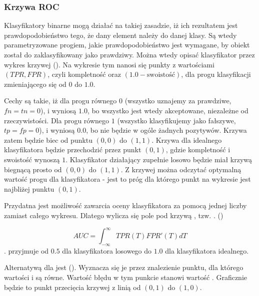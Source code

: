 \subsubsection{Krzywa ROC}

Klasyfikatory binarne mogą działać na takiej zasadzie, iż ich rezultatem jest prawdopodobieństwo
tego, że dany element należy do danej klasy. Są wtedy parametryzowane progiem,
jakie prawdopodobieństwo jest wymagane, by obiekt został do zaklasyfikowany jako prawdziwy.
Można wtedy opisać klasyfikator przez wykres krzywej 
(). Na wykresie tym nanosi się punkty z wartościami
$(\mathit{TPR}, \mathit{FPR})$, czyli kompletność oraz $(1.0 - \text{swoistość})$, dla progu klasyfikacji
zmieniającego się od $0$ do $1.0$.

Cechy  są takie, iż dla progu równego $0$ (wszystko uznajemy za prawdziwe, $fn = tn = 0$),
 i 
wyniosą $1.0$, bo wszystko jest wtedy akceptowane, niezależne od rzeczywistości.
Dla progu równego $1$ (wszystko klasyfikujemy jako fałszywe, $tp = fp = 0$),
 i  wyniosą $0.0$, bo nie będzie w ogóle żadnych pozytywów.
Krzywa zatem będzie biec od punktu $(0, 0)$ do $(1, 1)$. Krzywa dla idealnego klasyfikatora
będzie przechodzić przez punkt $(0, 1)$, gdzie kompletność i swoistość wynoszą $1$. Klasyfikator
działający zupełnie losowo będzie miał krzywą biegnącą prosto od $(0, 0)$ do $(1, 1)$. Z krzywej
 można odczytać optymalną wartość progu dla klasyfikatora - jest to próg dla którego punkt
na wykresie jest najbliżej punktu $(0, 1)$.

Przydatna jest możliwość zawarcia oceny klasyfikatora za pomocą jednej liczby zamiast całego wykresu.
Dlatego wylicza się pole pod krzywą , tzw. . ()

$$\mathit{AUC} = \int_{-\infty}^{\infty} \mathit{TPR}(T) \mathit{FPR}'(T) dT$$.
 przyjmuje od $0.5$ dla klasyfikatora losowego do $1.0$ dla klasyfikatora idealnego.

Alternatywą dla  jest  (). Wyznacza się je
przez znalezienie punktu, dla którego wartości  i  są równe. Wartość błędu
w tym punkcie stanowi wartość . Graficznie będzie to punkt przecięcia krzywej 
z linią od $(0, 1)$ do $(1, 0)$.


